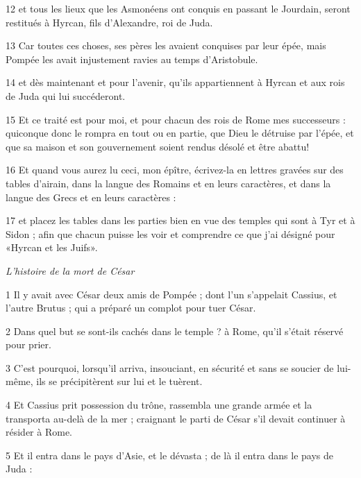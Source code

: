 \par 12 et tous les lieux que les Asmonéens ont conquis en passant le Jourdain, seront restitués à Hyrcan, fils d'Alexandre, roi de Juda.

\par 13 Car toutes ces choses, ses pères les avaient conquises par leur épée, mais Pompée les avait injustement ravies au temps d'Aristobule.

\par 14 et dès maintenant et pour l'avenir, qu'ils appartiennent à Hyrcan et aux rois de Juda qui lui succéderont.

\par 15 Et ce traité est pour moi, et pour chacun des rois de Rome mes successeurs : quiconque donc le rompra en tout ou en partie, que Dieu le détruise par l'épée, et que sa maison et son gouvernement soient rendus désolé et être abattu!

\par 16 Et quand vous aurez lu ceci, mon épître, écrivez-la en lettres gravées sur des tables d'airain, dans la langue des Romains et en leurs caractères, et dans la langue des Grecs et en leurs caractères :

\par 17 et placez les tables dans les parties bien en vue des temples qui sont à Tyr et à Sidon ; afin que chacun puisse les voir et comprendre ce que j'ai désigné pour «Hyrcan et les Juifs».


\par \textit{L'histoire de la mort de César}

\par 1 Il y avait avec César deux amis de Pompée ; dont l'un s'appelait Cassius, et l'autre Brutus ; qui a préparé un complot pour tuer César.

\par 2 Dans quel but se sont-ils cachés dans le temple ? à Rome, qu'il s'était réservé pour prier.

\par 3 C'est pourquoi, lorsqu'il arriva, insouciant, en sécurité et sans se soucier de lui-même, ils se précipitèrent sur lui et le tuèrent.

\par 4 Et Cassius prit possession du trône, rassembla une grande armée et la transporta au-delà de la mer ; craignant le parti de César s'il devait continuer à résider à Rome.

\par 5 Et il entra dans le pays d'Asie, et le dévasta ; de là il entra dans le pays de Juda :

